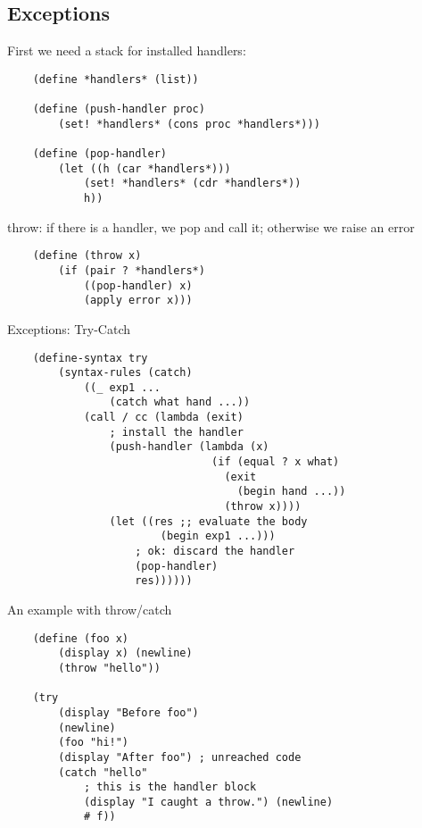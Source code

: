 \subsection{Exceptions}
First we need a stack for installed handlers:
\begin{lstlisting}
    (define *handlers* (list))

    (define (push-handler proc)
        (set! *handlers* (cons proc *handlers*)))
    
    (define (pop-handler)
        (let ((h (car *handlers*)))
            (set! *handlers* (cdr *handlers*))
            h))
\end{lstlisting}
throw: if there is a handler, we pop and call it; otherwise we raise an error
\begin{lstlisting}
    (define (throw x)
        (if (pair ? *handlers*)
            ((pop-handler) x)
            (apply error x)))
\end{lstlisting}
Exceptions: Try-Catch
\begin{lstlisting}
    (define-syntax try
        (syntax-rules (catch)
            ((_ exp1 ...
                (catch what hand ...))
            (call / cc (lambda (exit)
                ; install the handler
                (push-handler (lambda (x)
                                (if (equal ? x what)
                                  (exit
                                    (begin hand ...))
                                  (throw x))))
                (let ((res ;; evaluate the body
                        (begin exp1 ...)))
                    ; ok: discard the handler
                    (pop-handler)
                    res))))))
\end{lstlisting}
An example with throw/catch
\begin{lstlisting}
    (define (foo x)
        (display x) (newline)
        (throw "hello"))

    (try
        (display "Before foo")
        (newline)
        (foo "hi!")
        (display "After foo") ; unreached code
        (catch "hello"
            ; this is the handler block
            (display "I caught a throw.") (newline)
            # f))
\end{lstlisting}









